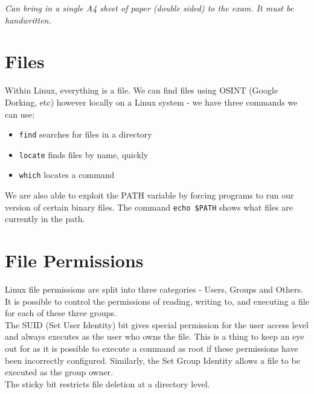 
\textit{Can bring in a single A4 sheet of paper (double sided) to the exam. It must be handwritten.}




\section{Files}
Within Linux, everything is a file. We can find files using OSINT (Google Dorking, etc) however locally on a Linux system - we have three commands we can use:
\begin{itemize}
    \item \verb|find| searches for files in a directory
    \item \verb|locate| finds files by name, quickly
    \item \verb|which| locates a command
\end{itemize}
We are also able to exploit the PATH variable by forcing programs to run our version of certain binary files. The command \verb|echo $PATH| shows what files are currently in the path.

\section{File Permissions}
Linux file permissions are split into three categories - Users, Groups and Others. It is possible to control the permissions of reading, writing to, and executing a file for each of these three groups. \\

The SUID (Set User Identity) bit gives special permission for the user access level and always executes as the user who owns the file. This is a thing to keep an eye out for as it is possible to execute a command as root if these permissions have been incorrectly configured. Similarly, the Set Group Identity allows a file to be executed as the group owner.\\

The sticky bit restricts file deletion at a directory level.
